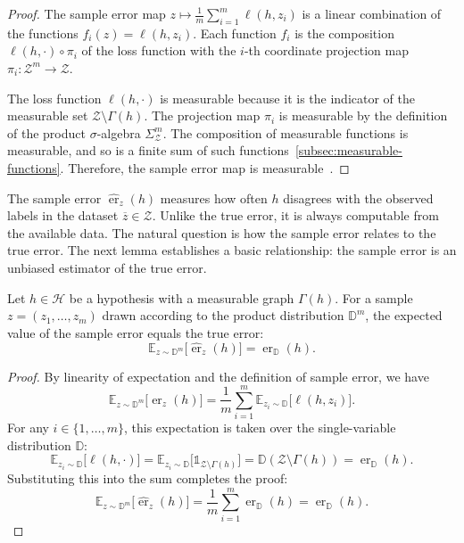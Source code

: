 \begin{proof}

    The sample error map $z \mapsto \frac{1}{m}\sum_{i=1}^m \ell(h,z_i)$ is a linear combination of the functions $f_i(z) = \ell(h,z_i)$. Each function $f_i$ is the composition $\ell(h, \cdot) \circ \pi_i$ of the loss function with the $i$-th coordinate projection map $\pi_i: \mathcal{Z}^m \to \mathcal{Z}$.

    The loss function $\ell(h, \cdot)$ is measurable because it is the indicator of the measurable set $\mathcal{Z}\setminus\Gamma(h)$. The projection map $\pi_i$ is measurable by the definition of the product $\sigma$-algebra $\Sigma_{\mathcal{Z}}^m$. The composition of measurable functions is measurable, and so is a finite sum of such functions~\ref{subsec:measurable-functions}. Therefore, the sample error map is measurable~\cite[Prop 2.4]{FollandRealAnalysis}.
    \qedhere
\end{proof}

The sample error $\hat{\operatorname{er}}_z(h)$ measures how often $h$ disagrees with the observed labels in the dataset $\overline{z} \in \mathcal{Z}$. Unlike the true error, it is always computable from the available data. The natural question is how the sample error relates to the true error. The next lemma establishes a basic relationship: the sample error is an unbiased estimator of the true error.

\begin{lemma}
    \label{lem:sample-error-unbiased}
    Let $h \in \mathcal{H}$ be a hypothesis with a measurable graph $\Gamma(h)$. For a sample $z = (z_1, \dots, z_m)$ drawn according to the product distribution $\mathbb{D}^m$, the expected value of the sample error equals the true error:
    \[
        \mathbb{E}_{z\sim\mathbb{D}^m}\bigl[\hat{\operatorname{er}}_{z}(h)\bigr] = \operatorname{er}_{\mathbb{D}}(h).
    \]
\end{lemma}

\begin{proof}

    By linearity of expectation and the definition of sample error, we have
    \[
        \mathbb{E}_{z\sim\mathbb{D}^m}\bigl[\hat{\operatorname{er}}_{z}(h)\bigr] = \frac{1}{m}\sum_{i=1}^m \mathbb{E}_{z_i\sim\mathbb{D}}\bigl[\ell(h,z_i)\bigr].
    \]
    For any $i \in \{1, \dots, m\}$, this expectation is taken over the single-variable distribution $\mathbb{D}$:
    \[
        \mathbb{E}_{z_i\sim\mathbb{D}}\bigl[\ell(h,\cdot)\bigr] = \mathbb{E}_{z_i\sim\mathbb{D}}\bigl[\mathds{1}_{\mathcal{Z}\setminus\Gamma(h)}\bigr] = \mathbb{D}(\mathcal{Z}\setminus\Gamma(h))=\operatorname{er}_{\mathbb{D}}(h).
    \]
    Substituting this into the sum completes the proof:
    \[
        \mathbb{E}_{z\sim\mathbb{D}^m}\bigl[\hat{\operatorname{er}}_{z}(h)\bigr] = \frac{1}{m}\sum_{i=1}^m \operatorname{er}_{\mathbb{D}}(h) = \operatorname{er}_{\mathbb{D}}(h).
    \]
    \qedhere
\end{proof}

